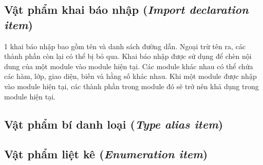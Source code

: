 \subsection{Vật phẩm khai báo nhập (\textit{Import declaration item})}

\regeximportitem

1 khai báo nhập bao gồm tên và danh sách đường dẫn. Ngoại trừ tên ra, các thành phần còn lại có thể bị bỏ qua. Khai báo nhập được sử dụng để chèn nội dung của một module vào module hiện tại. Các module khác nhau có thể chứa các hàm, lớp, giao diện, biến và hằng số khác nhau. Khi một module được nhập vào module hiện tại, các thành phần trong module đó sẽ trở nên khả dụng trong module hiện tại.

\subsection{Vật phẩm bí danh loại (\textit{Type alias item})}

\subsection{Vật phẩm liệt kê (\textit{Enumeration item})}
